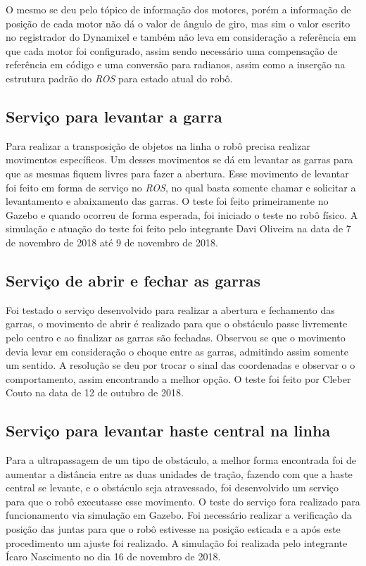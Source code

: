 O mesmo se deu pelo tópico de informação dos motores, porém a informação de posição de cada motor não dá o valor de ângulo de giro, mas sim o valor escrito no registrador do Dynamixel e também não leva em consideração a referência em que cada motor foi configurado, assim sendo necessário uma compensação de referência em código e uma conversão para radianos, assim como a inserção na estrutura padrão do \textit{ROS} para estado atual do robô.

\subsection{Serviço para levantar a garra}
Para realizar a transposição de objetos na linha o robô precisa realizar movimentos específicos. Um desses movimentos se dá em levantar as garras para que as mesmas fiquem livres para fazer a abertura. Esse movimento de levantar foi feito em forma de serviço no \textit{ROS}, no qual basta somente chamar e solicitar a levantamento e abaixamento das garras. O teste foi feito primeiramente no Gazebo e quando ocorreu de forma esperada, foi iniciado o teste no robô físico. A simulação e atuação do teste foi feito pelo integrante Davi Oliveira na data de 7 de novembro de 2018 até 9 de novembro de 2018.

\subsection{Serviço de abrir e fechar as garras}
Foi testado o serviço desenvolvido para realizar a abertura e fechamento das garras, o movimento de abrir é realizado para que o obstáculo passe livremente pelo centro e ao finalizar as garras são fechadas. Observou se que o movimento devia levar em consideração o choque entre as garras, admitindo assim somente um sentido. A resolução se deu por trocar o sinal das coordenadas e observar o o comportamento, assim encontrando a melhor opção. O teste foi feito por Cleber Couto na data de 12 de outubro de 2018.

\subsection{Serviço para levantar haste central na linha}
Para a ultrapassagem de um tipo de obstáculo, a melhor forma encontrada foi de aumentar a distância entre as duas unidades de tração, fazendo com que a haste central se levante, e o obstáculo seja atravessado, foi desenvolvido um serviço para que o robô executasse esse movimento. O teste do serviço fora realizado para funcionamento via simulação em Gazebo. Foi necessário realizar a verificação da posição das juntas para que o robô estivesse na posição esticada e a após este procedimento um ajuste foi realizado. A simulação foi realizada pelo integrante Ícaro Nascimento no dia 16 de novembro de 2018.

